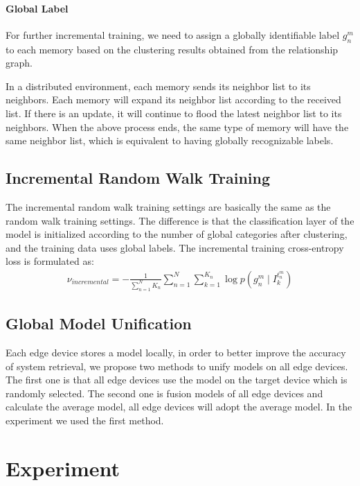 \documentclass{article}
\begin{document}
\paragraph{Global Label}For further incremental training, we need to assign a globally identifiable label $g_{n}^{m}$ to each memory based on the clustering results obtained from the relationship graph.


In a distributed environment, each memory sends its neighbor list to its neighbors. Each memory will expand its neighbor list according to the received list. If there is an update, it will continue to flood the latest neighbor list to its neighbors. When the above process ends, the same type of memory will have the same neighbor list, which is equivalent to having globally recognizable labels.

\subsection{Incremental Random Walk Training}
The incremental random walk training settings are basically the same as the random walk training settings. The difference is that the classification layer of the model is initialized according to the number of global categories after clustering, and the training data uses global labels. The incremental training cross-entropy loss is formulated as:
\begin{equation}
\begin{aligned}
    \nu _{incremental}=-\frac{1}{\sum_{n=1}^{N} K_{n}}\sum_{n=1}^{N}\sum_{k=1}^{K_{n}}\log p(g_{n}^{m}\mid I_{k}^{t_{n}^{m}})
\end{aligned}
\end{equation}

\subsection{Global Model Unification}
Each edge device stores a model locally, in order to better improve the accuracy of system retrieval, we propose two methods to unify models on all edge devices. The first one is that all edge devices use the model on the target device which is randomly selected. The second one is fusion models of all edge devices and calculate the average model, all edge devices will adopt the average model. In the experiment we used the first method.




\section{Experiment}
\end{document}
